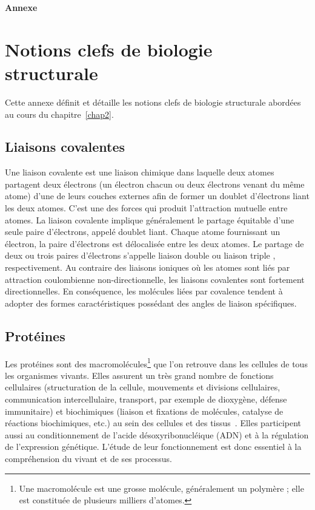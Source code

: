 
\begin{appendices}
\clearpage
\let\clearpage\relax
\vspace*{\fill}
\begin{center}
  \Huge\bfseries Annexe
\end{center}

\vspace*{\fill}
\chapter{Notions clefs de biologie structurale}
\minitoc
\label{appendix:annexeA}
	Cette annexe définit et détaille les notions clefs de biologie structurale abordées au cours du chapitre~\ref{chap2}.
	
	\section{Liaisons covalentes}
	Une liaison covalente est une liaison chimique dans laquelle deux atomes partagent deux électrons (un électron chacun ou deux électrons venant du même atome) d'une de leurs couches externes afin de former un doublet d'électrons liant les deux atomes. C'est une des forces qui produit l'attraction mutuelle entre atomes. La liaison covalente implique généralement le partage équitable d'une seule paire d'électrons, appelé doublet liant. Chaque atome fournissant un électron, la paire d'électrons est délocalisée entre les deux atomes. Le partage de deux ou trois paires d'électrons s'appelle \og liaison double \fg{} ou \og liaison triple \fg{}, respectivement. Au contraire des liaisons ioniques où les atomes sont liés par attraction coulombienne non-directionnelle, les liaisons covalentes sont fortement directionnelles. En conséquence, les molécules liées par covalence tendent à adopter des formes caractéristiques possédant des angles de liaison spécifiques.
	
	\section{Protéines}
	Les protéines sont des macromolécules\footnote{Une macromolécule est une \og grosse \fg{} molécule, généralement un polymère ; elle est constituée de plusieurs milliers d'atomes.} que l'on retrouve dans les cellules de tous les organismes vivants. Elles assurent un très grand nombre de fonctions cellulaires (structuration de la cellule, mouvements et divisions cellulaires, communication intercellulaire, transport, par exemple de dioxygène, défense immunitaire) et biochimiques (liaison et fixations de molécules, catalyse de réactions biochimiques, etc.) au sein des cellules et des tissus~\cite{lodish2004molecular}. Elles participent aussi au conditionnement de l'acide désoxyribonucléique (ADN) et à la régulation de l'expression génétique. L'étude de leur fonctionnement est donc essentiel à la compréhension du vivant et de ses processus.
	

\end{appendices}
